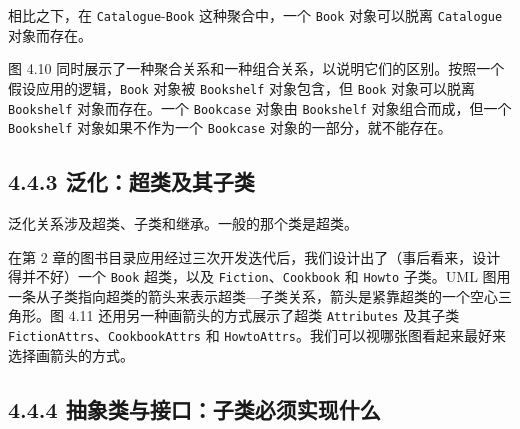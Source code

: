 相比之下，在 \texttt{Catalogue}-\texttt{Book} 这种聚合中，一个 \texttt{Book} 对象可以脱离 \texttt{Catalogue} 对象而存在。


图 4.10 同时展示了一种聚合关系和一种组合关系，以说明它们的区别。按照一个假设应用的逻辑，\texttt{Book} 对象被 \texttt{Bookshelf} 对象包含，但 \texttt{Book} 对象可以脱离 \texttt{Bookshelf} 对象而存在。一个 \texttt{Bookcase} 对象由 \texttt{Bookshelf} 对象组合而成，但一个 \texttt{Bookshelf} 对象如果不作为一个 \texttt{Bookcase} 对象的一部分，就不能存在。


\subsection{4.4.3 泛化：超类及其子类}

泛化关系涉及超类、子类和继承。一般的那个类是超类。

在第 2 章的图书目录应用经过三次开发迭代后，我们设计出了（事后看来，设计得并不好）一个 \texttt{Book} 超类，以及 \texttt{Fiction}、\texttt{Cookbook} 和 \texttt{Howto} 子类。UML 图用一条从子类指向超类的箭头来表示超类—子类关系，箭头是紧靠超类的一个空心三角形。图 4.11 还用另一种画箭头的方式展示了超类 \texttt{Attributes} 及其子类 \texttt{Fiction\allowbreak{}Attrs}、\texttt{Cookbook\allowbreak{}Attrs} 和 \texttt{Howto\allowbreak{}Attrs}。我们可以视哪张图看起来最好来选择画箭头的方式。


\subsection{4.4.4 抽象类与接口：子类必须实现什么}

